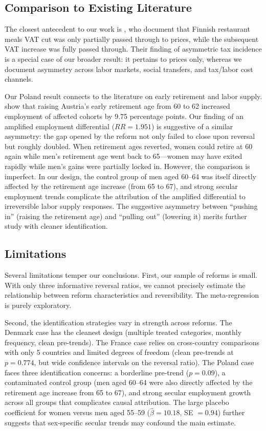 \documentclass[12pt]{article}
\begin{document}
\subsection{Comparison to Existing Literature}

The closest antecedent to our work is \citet{benzarti2020really}, who document that Finnish restaurant meals VAT cut was only partially passed through to prices, while the subsequent VAT increase was fully passed through. Their finding of asymmetric tax incidence is a special case of our broader result: it pertains to prices only, whereas we document asymmetry across labor markets, social transfers, and tax/labor cost channels.

Our Poland result connects to the literature on early retirement and labor supply. \citet{staubli2013does} show that raising Austria's early retirement age from 60 to 62 increased employment of affected cohorts by 9.75 percentage points. Our finding of an amplified employment differential ($RR = 1.951$) is suggestive of a similar asymmetry: the gap opened by the reform not only failed to close upon reversal but roughly doubled. When retirement ages reverted, women could retire at 60 again while men's retirement age went back to 65---women may have exited rapidly while men's gains were partially locked in. However, the comparison is imperfect. In our design, the control group of men aged 60--64 was itself directly affected by the retirement age increase (from 65 to 67), and strong secular employment trends complicate the attribution of the amplified differential to irreversible labor supply responses. The suggestive asymmetry between ``pushing in'' (raising the retirement age) and ``pulling out'' (lowering it) merits further study with cleaner identification.

\subsection{Limitations}

Several limitations temper our conclusions. First, our sample of reforms is small. With only three informative reversal ratios, we cannot precisely estimate the relationship between reform characteristics and reversibility. The meta-regression is purely exploratory.

Second, the identification strategies vary in strength across reforms. The Denmark case has the cleanest design (multiple treated categories, monthly frequency, clean pre-trends). The France case relies on cross-country comparisons with only 5 countries and limited degrees of freedom (clean pre-trends at $p = 0.774$, but wide confidence intervals on the reversal ratio). The Poland case faces three identification concerns: a borderline pre-trend ($p = 0.09$), a contaminated control group (men aged 60--64 were also directly affected by the retirement age increase from 65 to 67), and strong secular employment growth across all groups that complicates causal attribution. The large placebo coefficient for women versus men aged 55--59 ($\hat{\beta} = 10.18$, SE $= 0.94$) further suggests that sex-specific secular trends may confound the main estimate.
\end{document}
